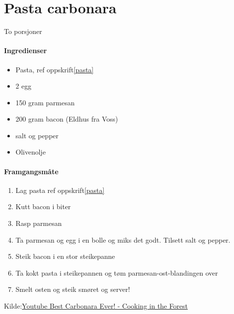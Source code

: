 \section{Pasta carbonara}
\label{Pastacarbonara}

To porsjoner\\

\paragraph{Ingredienser}
\begin{itemize}[noitemsep]
	\item Pasta, ref oppskrift\ref{pasta}
	\item 2 egg
	\item 150 gram parmesan
	\item 200 gram bacon (Eldhus fra Voss)
  \item salt og pepper
	\item Olivenolje
\end{itemize}

\paragraph{Framgangsmåte}
\begin{enumerate}[noitemsep]
	\item Lag pasta ref oppskrift\ref{pasta}
	\item Kutt bacon i biter
	\item Rasp parmesan
	\item Ta parmesan og egg i en bolle og miks det godt. Tilsett salt og pepper.
	\item Steik bacon i en stor steikepanne
	\item Ta kokt pasta i steikepannen og tøm parmesan-ost-blandingen over
	\item Smelt osten og steik smøret og server!
\end{enumerate}

Kilde:\href{https://youtu.be/eISr0vQhRhc}{Youtube Best Carbonara Ever! - Cooking in the Forest}
